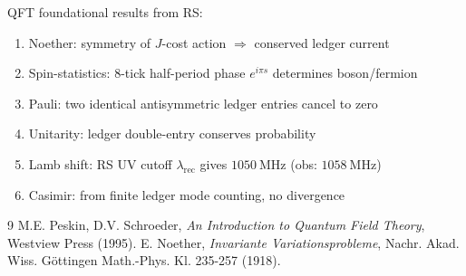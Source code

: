 \documentclass[12pt,a4paper]{article}
\theoremstyle{definition}
\theoremstyle{remark}
\begin{document}
QFT foundational results from RS:
\begin{enumerate}
\item Noether: symmetry of $J$-cost action $\Rightarrow$ conserved ledger current
\item Spin-statistics: 8-tick half-period phase $e^{i\pi s}$ determines boson/fermion
\item Pauli: two identical antisymmetric ledger entries cancel to zero
\item Unitarity: ledger double-entry conserves probability
\item Lamb shift: RS UV cutoff $\lambda_\mathrm{rec}$ gives $1050~\text{MHz}$ (obs: $1058~\text{MHz}$)
\item Casimir: from finite ledger mode counting, no divergence
\end{enumerate}

\begin{thebibliography}{9}
 M.E. Peskin, D.V. Schroeder, \emph{An Introduction to Quantum Field Theory}, 
Westview Press (1995).
 E. Noether, \emph{Invariante Variationsprobleme}, 
Nachr. Akad. Wiss. Göttingen Math.-Phys. Kl. 235-257 (1918).
\end{thebibliography}
\end{document}
